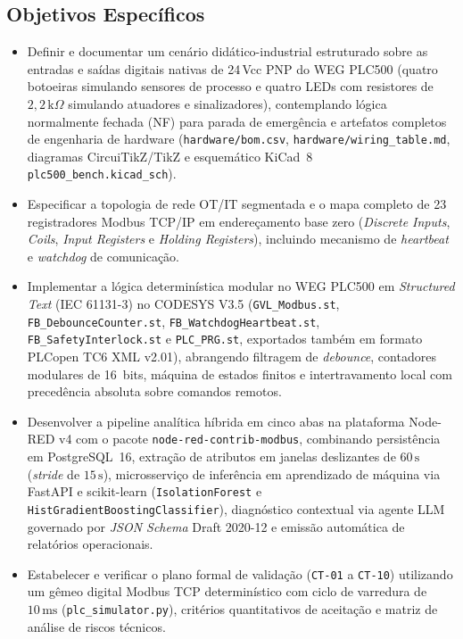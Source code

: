 \subsection{Objetivos Específicos}
\begin{itemize}
  \item Definir e documentar um cenário didático-industrial estruturado sobre as entradas e saídas digitais nativas de 24\,Vcc PNP do WEG PLC500 (quatro botoeiras simulando sensores de processo e quatro LEDs com resistores de $2{,}2\,\text{k}\Omega$ simulando atuadores e sinalizadores), contemplando lógica normalmente fechada (NF) para parada de emergência e artefatos completos de engenharia de hardware (\texttt{hardware/bom.csv}, \texttt{hardware/wiring\_table.md}, diagramas CircuiTikZ/TikZ e esquemático KiCad~8 \texttt{plc500\_bench.kicad\_sch}).
  \item Especificar a topologia de rede OT/IT segmentada e o mapa completo de 23 registradores Modbus TCP/IP em endereçamento base zero (\textit{Discrete Inputs}, \textit{Coils}, \textit{Input Registers} e \textit{Holding Registers}), incluindo mecanismo de \textit{heartbeat} e \textit{watchdog} de comunicação.
  \item Implementar a lógica determinística modular no WEG PLC500 em \textit{Structured Text} (IEC 61131-3) no CODESYS V3.5 (\texttt{GVL\_Modbus.st}, \texttt{FB\_DebounceCounter.st}, \texttt{FB\_WatchdogHeartbeat.st}, \texttt{FB\_SafetyInterlock.st} e \texttt{PLC\_PRG.st}, exportados também em formato PLCopen TC6 XML v2.01), abrangendo filtragem de \textit{debounce}, contadores modulares de 16~bits, máquina de estados finitos e intertravamento local com precedência absoluta sobre comandos remotos.
  \item Desenvolver a pipeline analítica híbrida em cinco abas na plataforma Node-RED v4 com o pacote \texttt{node-red-contrib-modbus}, combinando persistência em PostgreSQL~16, extração de atributos em janelas deslizantes de $60\,\text{s}$ (\textit{stride} de $15\,\text{s}$), microsserviço de inferência em aprendizado de máquina via FastAPI e scikit-learn (\texttt{IsolationForest} e \texttt{HistGradientBoostingClassifier}), diagnóstico contextual via agente LLM governado por \textit{JSON Schema} Draft 2020-12 e emissão automática de relatórios operacionais.
  \item Estabelecer e verificar o plano formal de validação (\texttt{CT-01} a \texttt{CT-10}) utilizando um gêmeo digital Modbus TCP determinístico com ciclo de varredura de $10\,\text{ms}$ (\texttt{plc\_simulator.py}), critérios quantitativos de aceitação e matriz de análise de riscos técnicos.
\end{itemize}


